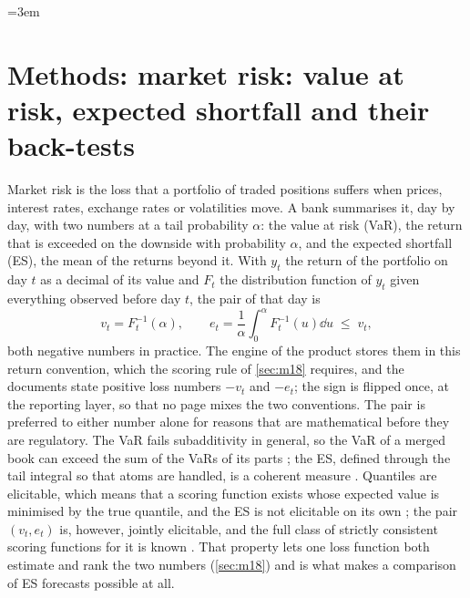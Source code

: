 
\emergencystretch=3em
\providecommand{\mkfn}[1]{\nolinkurl{#1}}

\section{Methods: market risk: value at risk, expected shortfall and their back-tests}
\label{sec:market}

Market risk is the loss that a portfolio of traded positions suffers when prices, interest rates, exchange rates or volatilities move.
A bank summarises it, day by day, with two numbers at a tail probability $\alpha$: the value at risk (VaR), the return that is
exceeded on the downside with probability $\alpha$, and the expected shortfall (ES), the mean of the returns beyond it. With $y_t$ the
return of the portfolio on day $t$ as a decimal of its value and $F_t$ the distribution function of $y_t$ given everything observed
before day $t$, the pair of that day is
\begin{equation}
v_t=F_t^{-1}(\alpha),\qquad e_t=\frac1\alpha\int_0^\alpha F_t^{-1}(u)\dd u\;\le\;v_t,
\label{eq:mk-def}
\end{equation}
both negative numbers in practice. The engine of the product stores them in this return convention, which the scoring rule of
\cref{sec:m18} requires, and the documents state positive loss numbers $-v_t$ and $-e_t$; the sign is flipped once, at the reporting
layer, so that no page mixes the two conventions. The pair is preferred to either number alone for reasons that are mathematical
before they are regulatory. The VaR fails subadditivity in general, so the VaR of a merged book can exceed the sum of the VaRs of its
parts \citep{market:artzner1999}; the ES, defined through the tail integral so that atoms are handled, is a coherent measure
\citep{credit-capital:acerbitasche2002}. Quantiles are elicitable, which means that a scoring function exists whose expected value is minimised
by the true quantile, and the ES is not elicitable on its own \citep{market:gneiting2011}; the pair $(v_t,e_t)$ is, however, jointly
elicitable, and the full class of strictly consistent scoring functions for it is known \citep{market:fisslerziegel2016}. That
property lets one loss function both estimate and rank the two numbers (\cref{sec:m18}) and is what makes a comparison of ES forecasts
possible at all.

